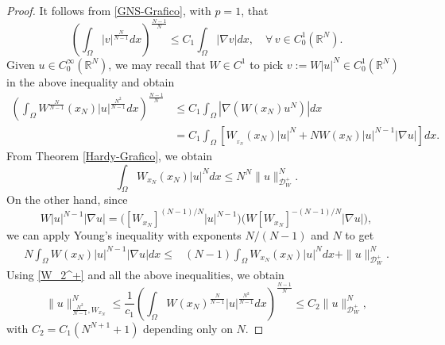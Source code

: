 \documentclass[10pt,a4paper]{amsart}
\newcommand{\dint}{\int_{\Omega}}
\begin{document}
    	\begin{proof}
		It follows from  \eqref{GNS-Grafico},  with $p=1$, that 
		\begin{equation}\label{GNS n=1}
			\left(\dint |v|^{\frac{N}{N-1}}dx\right)^{\frac{N-1}{N}} \leq C_1\dint |\nabla v|dx,
            \quad \forall \,v \in C_0^1(\mathbb{R}^N).
		\end{equation}
		 Given $u \in C^{\infty}_0(\mathbb{R}^N)$, we may recall that $W \in C^1$ to  
         pick   $v:=W|u|^N \in C_0^1(\mathbb{R}^N)$  in the above inequality  and obtain
      $$
		\begin{aligned}
			\left(\dint W^{\frac{N}{N-1}}(x_N)|u|^{\frac{N^2}{N-1}}dx\right)^{\frac{N-1}{N}}& 
            \leq C_1\dint |\nabla (W(x_N)u^N)|dx\\
			&= C_1  \dint \left[ W_{_{x_N}}(x_N)|u|^N+NW(x_N)|u|^{N-1}|\nabla u|\right]dx.
		\end{aligned}
		$$
        From Theorem \ref{Hardy-Grafico}, we obtain 
		$$
		\dint W_{x_N}(x_N)|u|^Ndx\leq N^ N\|u\|_{\mathcal{D}_W^+}^N.
		$$
		On the other hand, since
        $$
        W|u|^{N-1}|\nabla u|= \Big( [W_{x_N}]^{(N-1)/N}|u|^{N-1} \Big) 
        \Big( W [W_{x_N}]^{{-(N-1)/N}} |\nabla u|\Big),
        $$
        we can apply Young's inequality with 
        exponents $N/(N-1)$ and $N$ to get
      \begin{align*}
			N\dint W(x_N)|u|^{N-1}|\nabla u|dx	\leq&(N-1)
            \dint W_{x_N}(x_N)|u|^Ndx+\|u\|^N_{\mathcal{D}_W^+}.
		\end{align*}
        Using \eqref{W_2^+} and all the above inequalities, we obtain
        \begin{equation}\label{key2}	
        \|u\|_{\frac{N^2}{N-1},W_{x_N}}^N   \leq \frac{1}{c_1}\left(\dint  
        W(x_N)^{\frac{N}{N-1}}|u|^{\frac{N^2}{N-1}}dx\right)^{\frac{N-1}{N}} \leq 
        C_2\|u\|_{\mathcal{D}_W^+}^N,
        \end{equation}
        with $C_2=C_1 (N^{N+1}+1)$ depending only on $N$. 
        

\end{proof}
\end{document}
